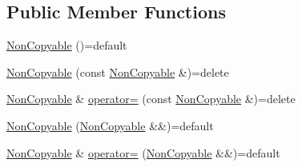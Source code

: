 \subsection*{Public Member Functions}
\begin{DoxyCompactItemize}
\item 
\hyperlink{classZeta_1_1NonCopyable_af5ba80833e6a68dac53d33c19013137e}{Non\+Copyable} ()=default
\item 
\hyperlink{classZeta_1_1NonCopyable_a75950979be4d6815fd48f8349b029d7b}{Non\+Copyable} (const \hyperlink{classZeta_1_1NonCopyable}{Non\+Copyable} \&)=delete
\item 
\hyperlink{classZeta_1_1NonCopyable}{Non\+Copyable} \& \hyperlink{classZeta_1_1NonCopyable_a6db77b43af9e31552f871b727771b840}{operator=} (const \hyperlink{classZeta_1_1NonCopyable}{Non\+Copyable} \&)=delete
\item 
\hyperlink{classZeta_1_1NonCopyable_a3937a4453d46df76d9ffc4e12e4de6b9}{Non\+Copyable} (\hyperlink{classZeta_1_1NonCopyable}{Non\+Copyable} \&\&)=default
\item 
\hyperlink{classZeta_1_1NonCopyable}{Non\+Copyable} \& \hyperlink{classZeta_1_1NonCopyable_a78e1fdbeb65b3bf7b2ce71daddedfc0e}{operator=} (\hyperlink{classZeta_1_1NonCopyable}{Non\+Copyable} \&\&)=default
\end{DoxyCompactItemize}



